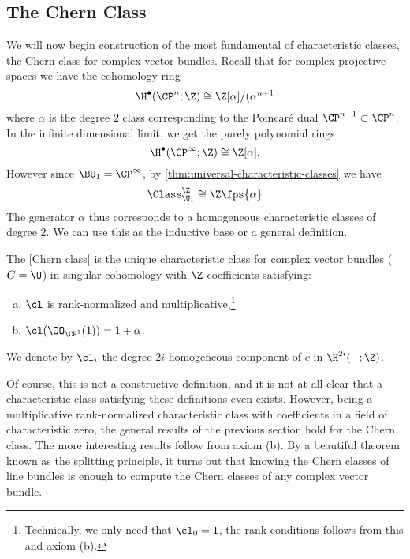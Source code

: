 \subsection{The Chern Class}

We will now begin construction of the most fundamental of characteristic classes, the Chern class for complex vector bundles. Recall that for complex projective spaces we have the cohomology ring
\[
	\H^\bullet(\CP^n;\Z)\cong \Z[\alpha]/(\alpha^{n+1}
\]
where $\alpha$ is the degree $2$ class corresponding to the Poincar\'e dual $\CP^{n-1}\subset \CP^n$.
In the infinite dimensional limit, we get the purely polynomial rings
\[
		\H^\bullet(\CP^\infty;\Z)\cong \Z[\alpha].
\]
However since $\BU_1=\CP^\infty$, by \cref{thm:universal-characteristic-classes} we have
\begin{equation}\label{eq:cczu1-a}
	\Class_{\U_1}^{\Z}\cong \Z\fps{\alpha}
\end{equation}
The generator $\alpha$ thus corresponds to a homogeneous characteristic classes of degree $2$. We can use this as the inductive base or a general definition.

\begin{definition}
	The [Chern class] is the unique characteristic class for complex vector bundles ($G=\U$) in singular cohomology with $\Z$ coefficients satisfying:
	\begin{enumerate}[(a)]
		\item $\cl$ is rank-normalized and multiplicative,\footnote{Technically, we only need that $\cl_0=1$, the rank conditions follows from this and axiom (b).}
		\item $\cl(\OO_{\CP^1}(1))=1+\alpha$.
	\end{enumerate}
	We denote by $\cl_i$ the degree $2i$ homogeneous component of $c$ in $\H^{2i}(-;\Z)$.
\end{definition}

Of course, this is not a constructive definition, and it is not at all clear that a characteristic class satisfying these definitions even exists.
However, being a multiplicative rank-normalized characteristic class with coefficients in a field of characteristic zero, the general results of the previous section hold for the Chern class. The more interesting results follow from axiom (b). By a beautiful theorem known as the splitting principle, it turns out that knowing the Chern classes of line bundles is enough to compute the Chern classes of any complex vector bundle.

